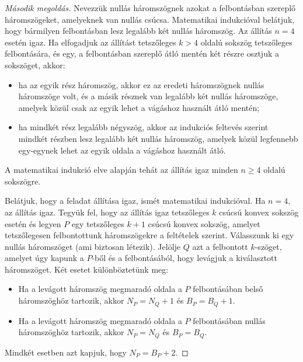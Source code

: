 \begin{proof}[Második megoldás]
Nevezzük nullás háromszögnek azokat a felbontásban szereplő háromszögeket,
amelyeknek van nullás csúcsa. Matematikai indukcióval belátjuk, hogy
bármilyen felbontásban lesz legalább két nullás háromszög. Az állítás
$n=4$ esetén igaz. Ha elfogadjuk az állítást tetszőleges $k>4$ oldalú
sokszög tetszőleges felbontására, és egy, a felbontásban szereplő
átló mentén két részre osztjuk a sokszöget, akkor: 
\begin{itemize}
\item ha az egyik rész háromszög, akkor ez az eredeti háromszögnek nullás
háromszöge volt, és a másik résznek van legalább két nullás háromszöge,
amelyek közül csak az egyik lehet a vágáshoz használt átló mentén;
\item ha mindkét rész legalább négyszög, akkor az indukciós feltevés szerint
mindkét részben lesz legalább két nullás háromszög, amelyek közül
legfennebb egy-egynek lehet az egyik oldala a vágáshoz használt átló. 
\end{itemize}
A matematikai indukció elve alapján tehát az állítás igaz minden $n\ge4$
oldalú sokszögre.\par Belátjuk, hogy a feladat állítása igaz, ismét
matematikai indukcióval. Ha $n=4$, az állítás igaz. Tegyük fel, hogy
az állítás igaz tetszőleges $k$ csúcsú konvex sokszög esetén és legyen
$P$ egy tetszőleges $k+1$ csúcsú konvex sokszög, amelyet tetszőlegesen
felbontottunk háromszögekre a feltételek szerint. Válasszunk ki egy
nullás háromszöget (ami biztosan létezik). Jelölje $Q$ azt a felbontott
$k$-szöget, amelyet úgy kapunk a $P$-ből és a felbontásából, hogy
levágjuk a kiválasztott háromszöget. Két esetet különböztetünk meg: 
\begin{itemize}
\item Ha a levágott háromszög megmaradó oldala a $P$ felbontásában belső
háromszöghöz tartozik, akkor $N_{P}=N_{Q}+1$ és $B_{P}=B_{Q}+1$.
\item Ha a levágott háromszög megmaradó oldala a $P$ felbontásában nullás
háromszöghöz tartozik, akkor $N_{P}=N_{Q}$ és $B_{P}=B_{Q}$.
\end{itemize}
Mindkét esetben azt kapjuk, hogy $N_{P}=B_{P}+2$.


\end{proof}
